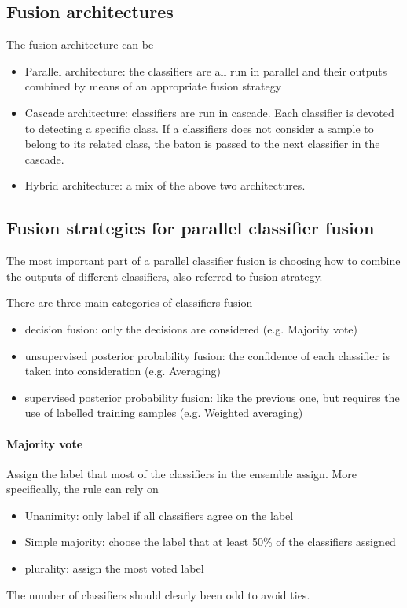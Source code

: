 \documentclass[oneside,onecolumn]{report}
\begin{document}
\subsection{Fusion architectures}
The fusion architecture can be
\begin{itemize}
    \item Parallel architecture: the classifiers are all run in parallel and their outputs combined by means of an appropriate fusion strategy

    \item Cascade architecture: classifiers are run in cascade.
    Each classifier is devoted to detecting a specific class.
    If a classifiers does not consider a sample to belong to its related class, the baton is passed to the next classifier in the cascade.

    \item Hybrid architecture: a mix of the above two architectures.
\end{itemize}


\subsection{Fusion strategies for parallel classifier fusion}
The most important part of a parallel classifier fusion is choosing how to combine the outputs of different classifiers, also referred to fusion strategy.

There are three main categories of classifiers fusion
\begin{itemize}
    \item decision fusion: only the decisions are considered (e.g. Majority vote)
    \item unsupervised posterior probability fusion: the confidence of each classifier is taken into consideration (e.g. Averaging)
    \item supervised posterior probability fusion: like the previous one, but requires the use of labelled training samples (e.g. Weighted averaging)
\end{itemize}

\paragraph{Majority vote}
Assign the label that most of the classifiers in the ensemble assign.
More specifically, the rule can rely on
\begin{itemize}
    \item Unanimity: only label if all classifiers agree on the label
    \item Simple majority: choose the label that at least 50\% of the classifiers assigned
    \item plurality: assign the most voted label
\end{itemize}
The number of classifiers should clearly been odd to avoid ties.
\end{document}
